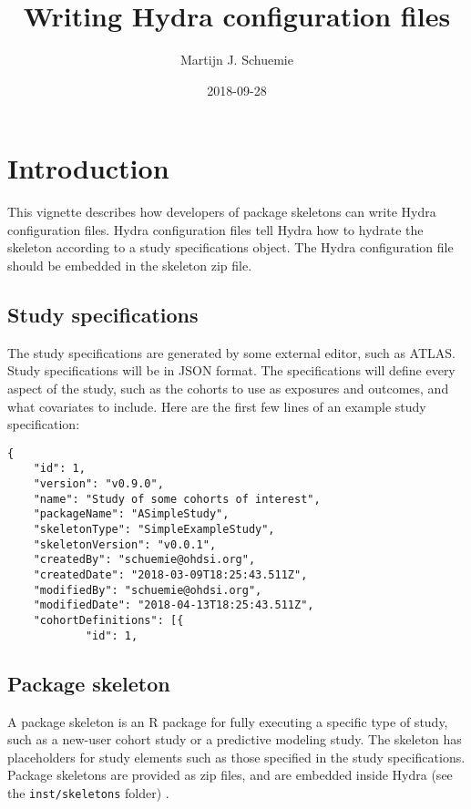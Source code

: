 \documentclass[]{article}
\title{Writing Hydra configuration files}
\author{Martijn J. Schuemie}
\date{2018-09-28}
\begin{document}
\maketitle

{
\setcounter{tocdepth}{2}
\tableofcontents
}
\hypertarget{introduction}{%
\section{Introduction}\label{introduction}}

This vignette describes how developers of package skeletons can write
Hydra configuration files. Hydra configuration files tell Hydra how to
hydrate the skeleton according to a study specifications object. The
Hydra configuration file should be embedded in the skeleton zip file.

\hypertarget{study-specifications}{%
\subsection{Study specifications}\label{study-specifications}}

The study specifications are generated by some external editor, such as
ATLAS. Study specifications will be in JSON format. The specifications
will define every aspect of the study, such as the cohorts to use as
exposures and outcomes, and what covariates to include. Here are the
first few lines of an example study specification:

\begin{verbatim}
{
    "id": 1,
    "version": "v0.9.0",
    "name": "Study of some cohorts of interest",
    "packageName": "ASimpleStudy",
    "skeletonType": "SimpleExampleStudy",
    "skeletonVersion": "v0.0.1",
    "createdBy": "schuemie@ohdsi.org",
    "createdDate": "2018-03-09T18:25:43.511Z",
    "modifiedBy": "schuemie@ohdsi.org",
    "modifiedDate": "2018-04-13T18:25:43.511Z",
    "cohortDefinitions": [{
            "id": 1,
\end{verbatim}

\hypertarget{package-skeleton}{%
\subsection{Package skeleton}\label{package-skeleton}}

A package skeleton is an R package for fully executing a specific type
of study, such as a new-user cohort study or a predictive modeling
study. The skeleton has placeholders for study elements such as those
specified in the study specifications. Package skeletons are provided as
zip files, and are embedded inside Hydra (see the
\texttt{inst/skeletons} folder) .
\end{document}
